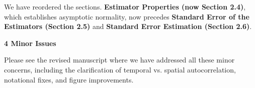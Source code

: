 \documentclass[docs/main.tex]{subfiles}
\newcommand{\reviewercomment}[1]{\vspace{0.3cm}\noindent\textbf{#1}\vspace{0.15cm}}
\begin{document}
We have reordered the sections. \textbf{Estimator Properties (now Section 2.4)}, which establishes asymptotic normality, now precedes \textbf{Standard Error of the Estimators (Section 2.5)} and \textbf{Standard Error Estimation (Section 2.6)}.

\reviewercomment{4 Minor Issues}

Please see the revised manuscript where we have addressed all these minor concerns, including the clarification of temporal vs. spatial autocorrelation, notational fixes, and figure improvements.
\end{document}
